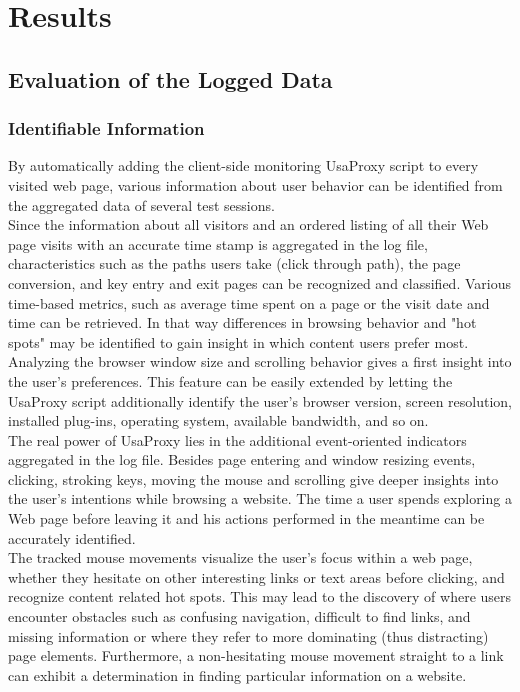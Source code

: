 \section{Results}
\label{sec:results}

\subsection{Evaluation of the Logged Data}

\subsubsection{Identifiable Information}
By automatically adding the client-side monitoring UsaProxy script to every visited web page, various information about user behavior can be identified from the aggregated data of several test sessions.\\

Since the information about all visitors and an ordered listing of all their Web page visits with an accurate time stamp is aggregated in the log file, characteristics such as the paths users take (click through path), the page conversion, and key entry and exit pages can be recognized and classified. Various time-based metrics, such as average time spent on a page or the visit date and time can be retrieved. In that way differences in browsing behavior and "hot spots" may be identified to gain insight in which content users prefer most. \\

Analyzing the browser window size and scrolling behavior gives a first insight into the user's preferences. This feature can be easily extended by letting the UsaProxy script additionally identify the user's browser version, screen resolution, installed plug-ins, operating system, available bandwidth, and so on.\\

The real power of UsaProxy lies in the additional event-oriented indicators aggregated in the log file. Besides page entering and window resizing events, clicking, stroking keys, moving the mouse and scrolling give deeper insights into the user's intentions while browsing a website. The time a user spends exploring a Web page before leaving it and his actions performed in the meantime can be accurately identified.\\

The tracked mouse movements visualize the user's focus within a web page, whether they hesitate on other interesting links or text areas before clicking, and recognize content related hot spots.
This may lead to the discovery of where users encounter obstacles such as confusing navigation, difficult to find links, and missing information or where they refer to more dominating (thus distracting) page elements. Furthermore, a non-hesitating mouse movement straight to a link can exhibit a determination in finding particular information on a website. \\

